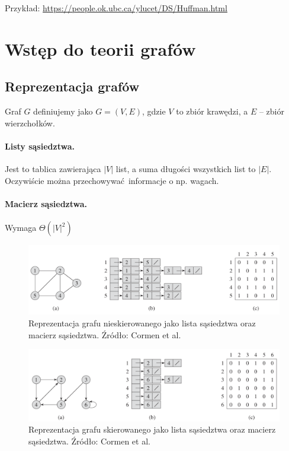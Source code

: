 \documentclass[10pt, oneside]{article}
\theoremstyle{remark}
\begin{document}
Przykład: \url{https://people.ok.ubc.ca/ylucet/DS/Huffman.html}


\section{Wstęp do teorii grafów}
\subsection{Reprezentacja grafów}

Graf $G$ definiujemy jako $G=(V, E)$, gdzie $V$ to zbiór krawędzi, a $E$ -- zbiór wierzchołków.
\paragraph{Listy sąsiedztwa.} 
Jest to tablica zawierająca $|V|$ list, a suma długości wszystkich list to $|E|$.
Oczywiście można przechowywać informacje o np. wagach.

\paragraph{Macierz sąsiedztwa.} 
Wymaga $\Theta(|V|^2)$

\begin{figure}[htpb]
	\centering
	\includegraphics[width=.9\textwidth]{figures/graphs}
	\caption{Reprezentacja grafu nieskierowanego jako lista sąsiedztwa oraz macierz sąsiedztwa. Źródło: Cormen et al.}
\end{figure}

\begin{figure}[htpb]
	\centering
	\includegraphics[width=.9\textwidth]{figures/graphs_directed}
	\caption{Reprezentacja grafu skierowanego jako lista sąsiedztwa oraz macierz sąsiedztwa. Źródło: Cormen et al.}
\end{figure}
\end{document}
